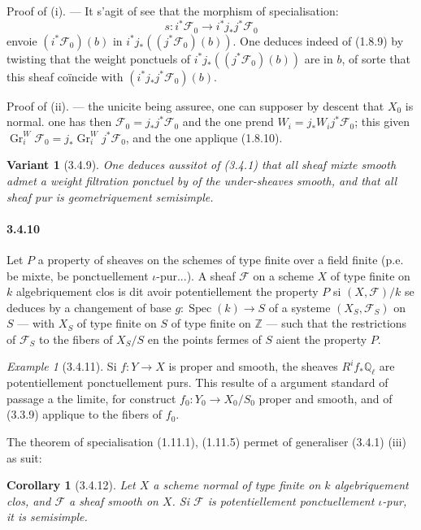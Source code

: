 \documentclass[12pt,a4paper]{article}
\theoremstyle{plain}
\newtheorem{corollary}[theorem]{Corollary}
\newtheorem{variante}[theorem]{Variant}
\theoremstyle{definition}
\theoremstyle{remark}
\newtheorem{example}[theorem]{Example}
\DeclareMathOperator{\Gr}{Gr}
\DeclareMathOperator{\Spec}{Spec}
\newcommand{\QQ}{{\mathbb{Q}}}
\newcommand{\ZZ}{{\mathbb{Z}}}
\begin{document}
Proof of (i). --- It s'agit of see that the morphism of specialisation:
\[ s : i^*\mathscr{F}_0 \to i^* j_* j^* \mathscr{F}_0 \]
envoie $(i^*\mathscr{F}_0)(b)$ in $i^* j_* ((j^*\mathscr{F}_0)(b))$. One deduces indeed of (1.8.9) by twisting that the weight ponctuels of $i^* j_* ((j^*\mathscr{F}_0)(b))$ are in $b$, of sorte that this sheaf co\"incide with $(i^* j_* j^* \mathscr{F}_0)(b)$.

Proof of (ii). --- the unicite being assuree, one can supposer by descent that $X_0$ is normal. one has then $\mathscr{F}_0 = j_* j^* \mathscr{F}_0$ and the one prend $W_i = j_* W_i j^* \mathscr{F}_0$; this given $\Gr_i^W \mathscr{F}_0 = j_* \Gr_i^W j^* \mathscr{F}_0$, and the one applique (1.8.10).

\begin{variante}[3.4.9]
One deduces aussitot of (3.4.1) that all sheaf mixte smooth admet a weight filtration ponctuel by of the under-sheaves smooth, and that all sheaf pur is geometriquement semisimple.
\end{variante}

\paragraph{3.4.10}
Let $P$ a property of sheaves on the schemes of type finite over a field finite (p.e. be mixte, be ponctuellement $\iota$-pur...). A sheaf $\mathscr{F}$ on a scheme $X$ of type finite on $k$ algebriquement clos is dit avoir potentiellement the property $P$ si $(X, \mathscr{F})/k$ se deduces by a changement of base $g : \Spec(k) \to S$ of a systeme $(X_S, \mathscr{F}_S)$ on $S$ --- with $X_S$ of type finite on $S$ of type finite on $\ZZ$ --- such that the restrictions of $\mathscr{F}_S$ to the fibers of $X_S/S$ en the points fermes of $S$ aient the property $P$.


\begin{example}[3.4.11]
Si $f : Y \to X$ is proper and smooth, the sheaves $R^i f_* \QQ_\ell$ are potentiellement ponctuellement purs. This resulte of a argument standard of passage a the limite, for construct $f_0 : Y_0 \to X_0 / S_0$ proper and smooth, and of (3.3.9) applique to the fibers of $f_0$.
\end{example}

The theorem of specialisation (1.11.1), (1.11.5) permet of generaliser (3.4.1) (iii) as suit:

\begin{corollary}[3.4.12]
Let $X$ a scheme normal of type finite on $k$ algebriquement clos, and $\mathscr{F}$ a sheaf smooth on $X$. Si $\mathscr{F}$ is potentiellement ponctuellement $\iota$-pur, it is semisimple.
\end{corollary}
\end{document}
